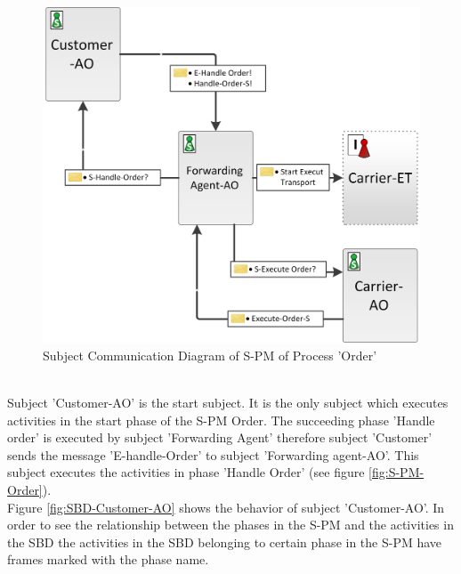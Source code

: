 \begin{figure}[hbtp]
	\includegraphics[scale=0.7]{Figures/Chapter5/Subject-Phase/SCD-Order_NEW.png}
	\caption{Subject Communication Diagram of S-PM of Process 'Order'}
	\label{fig:SCD-Order}
\end{figure}
\\
Subject 'Customer-AO' is the start subject. It is the only subject which executes activities in the start phase of the S-PM Order. The succeeding phase 'Handle order' is executed by subject 'Forwarding Agent' therefore subject 'Customer' sends the message 'E-handle-Order' to subject 'Forwarding agent-AO'. This subject executes the activities in phase 'Handle Order' (see figure \ref{fig:S-PM-Order}). \\
Figure \ref{fig:SBD-Customer-AO} shows the behavior of subject 'Customer-AO'. In order to see the relationship between the phases in the S-PM and the activities in the SBD the activities in the SBD belonging to certain phase in the S-PM have frames marked with the phase name.
